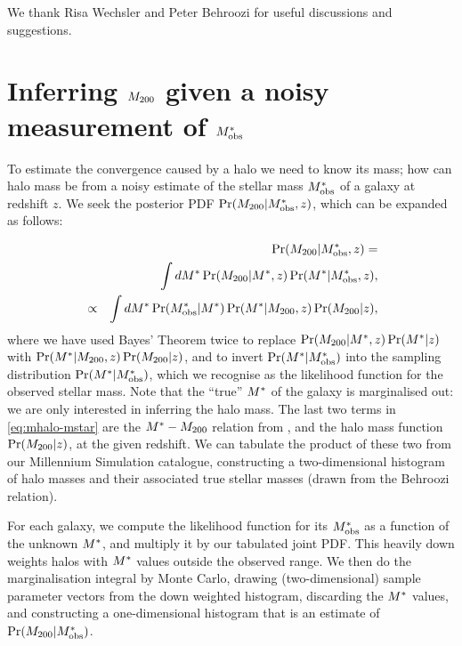 \documentclass[useAMS,usenatbib]{mn2e}
\begin{document}
We thank Risa Wechsler and Peter Behroozi 
for useful discussions and suggestions.



\appendix


\section{Inferring $M_{200}$ given a noisy measurement of $M^{*}_{\rm obs}$}
\label{appendix:MSMH}

To estimate the convergence caused by a halo we need to know its mass; how can 
halo mass be \infered from a noisy estimate of the stellar mass $M^{*}_{\rm obs}$
of a galaxy at redshift $z$. We seek the posterior
PDF $\Pr(M_{200}|M^{*}_{\rm obs},z)$, which can be expanded as follows:

\begin{eqnarray}
&& \Pr(M_{200}|M^{*}_{\rm obs},z) = \notag\\
&& \int dM^{*} \Pr(M_{200}|M^{*},z) \Pr(M^{*}|M^{*}_{\rm obs},z), \notag\\
&\propto& \int dM^{*} \Pr(M^{*}_{\rm obs}|M^{*}) \Pr(M^{*}|M_{200},z) \Pr(M_{200}|z),
\label{eq:mhalo-mstar}
\end{eqnarray}
where we have used Bayes' Theorem twice to replace
$\Pr(M_{200}|M^{*},z) \Pr(M^{*}|z)$ with 
$\Pr(M^{*}|M_{200},z) \Pr(M_{200}|z)$, and 
to invert $\Pr(M^{*}|M^{*}_{\rm obs})$ into the sampling
distribution $\Pr(M^{*}|M^{*}_{\rm obs})$, which we recognise as the likelihood
function for the observed stellar mass. Note that the ``true'' $M^{*}$ of the
galaxy is marginalised out: we are only interested in inferring the halo
mass. The last two terms in
\eqref{eq:mhalo-mstar} are the $M^{*}-M_{200}$ relation from
\citet{BehrooziEtal2010}, and the halo mass function $\Pr(M_{200}|z)$, at the
given redshift. We can
tabulate the product of these two from our Millennium Simulation catalogue,
constructing a two-dimensional histogram of halo masses and their associated
true stellar masses (drawn from the Behroozi relation). 

For each galaxy, we compute the likelihood function for its $M^{*}_{\rm obs}$ as a
function of the unknown $M^{*}$, and multiply it by our tabulated joint PDF.
This heavily down weights halos with $M^{*}$ values outside the observed
range. We then do the marginalisation integral by Monte Carlo, drawing
(two-dimensional) sample parameter vectors
from the down weighted histogram, discarding the $M^{*}$ values, and
constructing a one-dimensional histogram that is an estimate of
$\Pr(M_{200}|M^{*}_{\rm obs})$.
\end{document}
